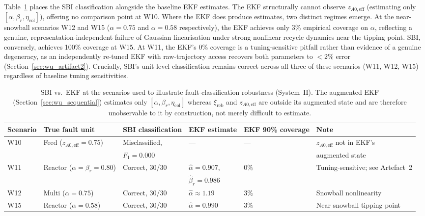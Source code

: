 \documentclass[aps,pre,twocolumn,superscriptaddress]{revtex4-2}
\begin{document}
Table~\ref{tab:wu_ekf_classification} places the SBI classification alongside 
the baseline EKF estimates. The EKF structurally cannot observe $z_{A0,\mathrm{eff}}$ 
(estimating only $[\alpha,\beta_r,\eta_\mathrm{col}]$), offering no comparison point at W10. 
Where the EKF does produce estimates, two distinct regimes emerge. At the 
near-snowball scenarios W12 and W15 ($\alpha = 0.75$ and $\alpha = 0.58$ respectively), 
the EKF achieves only 3\% empirical coverage on $\alpha$, reflecting a genuine, 
representation-independent failure of Gaussian linearisation under strong nonlinear 
recycle dynamics near the tipping point. SBI, conversely, achieves 100\% coverage at W15. 
At W11, the EKF's 0\% coverage is a tuning-sensitive pitfall rather than evidence 
of a genuine degeneracy, as an independently re-tuned EKF with raw-trajectory 
access recovers both parameters to $<2$\% error (Section~\ref{sec:wu_artifact2}). 
Crucially, SBI's unit-level classification remains correct across all three of these 
scenarios (W11, W12, W15) regardless of baseline tuning sensitivities.

\begin{table}[htbp]
\centering
\caption{SBI vs.\ EKF at the scenarios used to illustrate fault-classification
  robustness (System~II). The augmented EKF
  (Section~\ref{sec:wu_sequential}) estimates only $[\alpha,\beta_r,\eta_\mathrm{col}]$ whereas
  $\xi_\mathrm{reb}$ and $z_{A0,\mathrm{eff}}$ are outside its augmented state and are therefore unobservable to it by construction, not merely difficult to estimate.}
\label{tab:wu_ekf_classification}
\small
\begin{tabular}{llllll}
\toprule
Scenario & True fault unit & SBI classification           & EKF estimate & EKF 90\% coverage & Note \\
\midrule
W10 & Feed ($z_{A0,\mathrm{eff}}=0.75$)  & Misclassified,  & --- & --- & $z_{A0,\mathrm{eff}}$ not in EKF's  \\
    &                                    & $F_1=0.000$ &  & & augmented state \\

W11 & Reactor ($\alpha=\beta_r=0.80$)    & Correct, 30/30 & $\hat\alpha=0.907$,& 0\% & Tuning-sensitive; see Artefact~2 \\
       &                                     & & $\hat\beta_r=0.986$ &  & \\
W12 & Multi ($\alpha=0.75$)              & Correct, 30/30 & $\hat\alpha\approx1.19$ & 3\% & Snowball nonlinearity \\
W15 & Reactor ($\alpha=0.58$)            & Correct, 30/30 & $\hat\alpha=0.990$ & 3\% & Near snowball tipping point \\
\bottomrule
\end{tabular}
\end{table}
\end{document}
